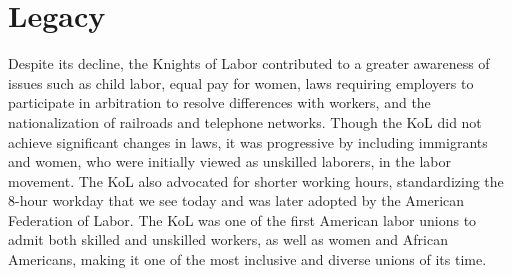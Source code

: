 \documentclass[a4paper, 12pt]{article}
\begin{document}
\section{Legacy}
\hspace{\parindent} Despite its decline, the Knights of Labor contributed to a greater awareness of issues such as child labor, equal pay for women, laws requiring employers to participate in arbitration to resolve differences with workers, and the nationalization of railroads and telephone networks.\autocite{Warren1951} Though the KoL did not achieve significant changes in laws, it was progressive by including immigrants and women, who were initially viewed as unskilled laborers, in the labor movement. The KoL also advocated for shorter working hours, standardizing the 8-hour workday that we see today and was later adopted by the American Federation of Labor. The KoL was one of the first American labor unions to admit both skilled and unskilled workers, as well as women and African Americans, making it one of the most inclusive and diverse unions of its time.\autocite{Lichtenstein1982}
\pagebreak
\printbibliography
\end{document}

